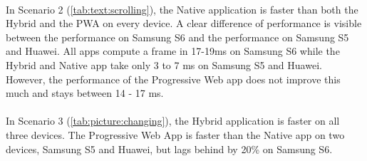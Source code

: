 \paragraph{}
In Scenario 2 (\autoref{tab:text:scrolling}), the Native application is faster than both the Hybrid and the PWA on every device. A clear difference of performance is visible between the performance on Samsung S6 and the performance on Samsung S5 and Huawei. All apps compute a frame in 17-19ms on Samsung S6 while the Hybrid and Native app take only 3 to 7 ms on Samsung S5 and Huawei. However, the performance of the Progressive Web app does not improve this much and stays between 14 - 17 ms. 

\paragraph{}
In Scenario 3 (\autoref{tab:picture:changing}), the Hybrid application is faster on all three devices. The Progressive Web App is faster than the Native app on two devices, Samsung S5 and Huawei, but lags behind by 20\% on Samsung S6. 




